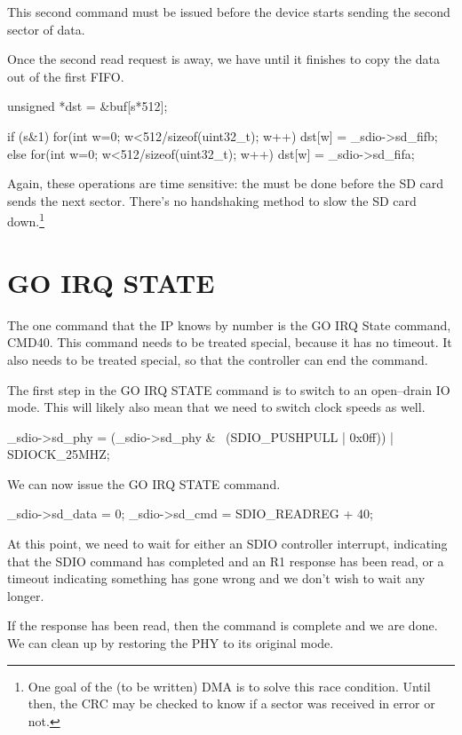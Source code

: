 \documentclass{gqtekspec}
\begin{document}
This second command must be issued before the device starts sending the
second sector of data.

Once the second read request is away, we have until it finishes to copy the
data out of the first FIFO.

\begin{CPP}
	unsigned *dst = &buf[s*512];

	if (s&1) {
		for(int w=0; w<512/sizeof(uint32_t); w++)
			dst[w] = _sdio->sd_fifb;
	} else {
		for(int w=0; w<512/sizeof(uint32_t); w++)
			dst[w] = _sdio->sd_fifa;
	}
\end{CPP}

Again, these operations are time sensitive: the must be done before the
SD card sends the next sector.  There's no handshaking method to slow the
SD card down.\footnote{One goal of the (to be written) DMA is to solve this
race condition.  Until then, the CRC may be checked to know if a sector
was received in error or not.}

\section{GO IRQ STATE}
The one command that the IP knows by number is the GO IRQ State command,
CMD40.  This command needs to be treated special, because it has no timeout.
It also needs to be treated special, so that the controller can end the
command.

The first step in the GO IRQ STATE command is to switch to an open--drain
IO mode.  This will likely also mean that we need to switch clock speeds
as well.

\begin{CPP}
	_sdio->sd_phy = (_sdio->sd_phy & ~(SDIO_PUSHPULL | 0x0ff))
			| SDIOCK_25MHZ;
\end{CPP}

We can now issue the GO IRQ STATE command.

\begin{CPP}
	_sdio->sd_data = 0;
	_sdio->sd_cmd  = SDIO_READREG + 40;
\end{CPP}

At this point, we need to wait for either an SDIO controller interrupt,
indicating that the SDIO command has completed and an R1 response has been
read, or a timeout indicating something has gone wrong and we don't wish to
wait any longer.

If the response has been read, then the command is complete and we are done.
We can clean up by restoring the PHY to its original mode.
\end{document}
